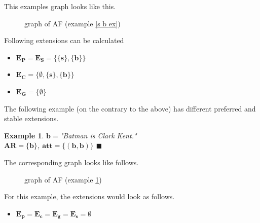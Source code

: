 \documentclass[12pt]{report}
\numberwithin{figure}{chapter}
\theoremstyle{break}
\newtheorem{exmpl}{Example}[chapter]
\newenvironment{myexmpl}{\begin{exmpl}}{$\blacksquare$ \end{exmpl}}
\begin{document}
This examples graph looks like this.
\begin{figure}[h!]
\begin{center}\end{center}
\caption{graph of AF (example \ref{s b ex})}
\end{figure}

Following extensions can be calculated
\begin{itemize}
	\item{$\bm{E_{P}=E_{S}=\{\{s\},\{b\}\}}$}
	\item{$\bm{E_{C}=\{\emptyset,\{s\},\{b\}\}}$}
	\item{$\bm{E_{G}=\{\emptyset\}}$}
\end{itemize}

\medskip
The following example (on the contrary to the above) has different preferred and stable extensions.

\newpage

\begin{myexmpl}
$\bm{b=}$"Batman is Clark Kent."\\
$\bm{AR=\{b\}}$, $\bm{att=\{(b,b)\}}$
\label{b loop ex}
\end{myexmpl}

The corresponding graph looks like follows.
\begin{figure}[h!]
\begin{center}\end{center}
\caption{graph of AF (example \ref{b loop ex})}
\end{figure}

For this example, the extensions would look as follows.
\begin{itemize}
	\item{$\bm{E_{p}=E_{c}=E_{g}=E_{s}=\emptyset}$}
\end{itemize}

\newpage
\end{document}
